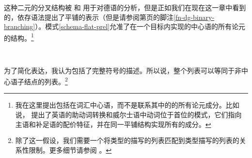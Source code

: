 这种二元的分叉结构被 \citet{Kathol95a,Kathol2000a}和 \citet{Mueller95c,Babel,Mueller99a,Mueller2002b}用于对德语的分析，但是正如我们在现在这一章中看到的，依存语法提出了平铺的表示（但是请参阅第\pageref{fn-dg-binary-branching}页的脚注\ref{fn-dg-binary-branching}）。模式\ref{schema-flat-prel}允准了在一个目标内实现的中心语的所有论元的结构。\footnote{我在这里提出包括在词汇中心语，而不是联系其中的\subcatlc 的所有论元成分。比如说， \citet[]{Borsley89}提出了英语的助动词转换和威尔士语中动词位于首位的模式，它们指向主语和补足语的配价特征，并在同一平铺结构实现所有的成分。}
\begin{schema}
\label{schema-flat-prel}
 \impl\\
\end{schema}
为了简化表达，我认为\subcatlc 包括了完整符号的描述。所以说，整个列表可以等同于非中心语子结点的列表。\footnote{%
除了这一假设，我们需要一个将类型的描写的列表匹配到类型描写的列表的关系性限制。更多细节请参阅 。
}
